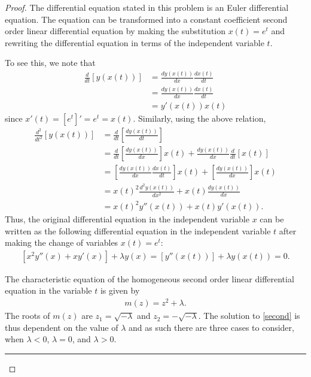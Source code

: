 \documentclass[12pt]{article}
\theoremstyle{definition}
\begin{document}
\begin{proof}
  The differential equation stated in this problem is an Euler differential
  equation. The equation can be transformed into a constant coefficient second
  order linear differential equation by making the substitution $x(t) = e^t$
  and rewriting the differential equation in terms of the independent variable
  $t$.

  To see this, we note that
  \begin{align*}
    \frac{d}{dt}\left[y(x(t))\right]
    &= \frac{dy(x(t))}{dx}\frac{dx(t)}{dt} \\
    &= \frac{dy(x(t))}{dx}\frac{dx(t)}{dt} \\
    &= y'(x(t)) x(t)
  \end{align*}
  since $x'(t) = [e^t]' = e^t = x(t)$. Similarly, using the above relation,
  \begin{align*}
    \frac{d^2}{dt^2}[y(x(t))]
    &= \frac{d}{dt}\left[\frac{dy(x(t))}{dt}\right] \\
    &= \frac{d}{dt}\left[\frac{dy(x(t))}{dx}\right] x(t) + \frac{dy(x(t))}{dx}\frac{d}{dt}\left[x(t)\right] \\
    &= \left[\frac{dy(x(t))}{dx}\frac{dx(t)}{dt}\right] x(t) + \left[\frac{dy(x(t))}{dx}\right] x(t) \\
    &= x(t)^2 \frac{d^2y(x(t))}{dx^2} + x(t)\frac{dy(x(t))}{dx} \\
    &= x(t)^2 y''(x(t)) + x(t)y'(x(t)).
  \end{align*}
  Thus, the original differential equation in the independent variable $x$ can
  be written as the following differential equation in the independent variable $t$
  after making the change of variables $x(t) = e^t$:
  \begin{align}\label{second}
    \left[x^2y''(x) + xy'(x)\right] + \lambda y(x) = \left[y''(x(t))\right] + \lambda y(x(t)) = 0.
  \end{align}

  The characteristic equation of the homogeneous second order linear differential
  equation in the variable $t$ is given by
  \begin{align}\label{char}
    m(z) = z^2 + \lambda.
  \end{align}
  The roots of $m(z)$ are $z_1=\sqrt{-\lambda}$ and $z_2=-\sqrt{-\lambda}$.
  The solution to \eqref{second} is thus dependent on the value of $\lambda$
  and as such there are three cases to consider, when $\lambda < 0$, $\lambda = 0$,
  and $\lambda > 0$.
  \rule{\textwidth}{1pt}


\end{proof}
\end{document}
